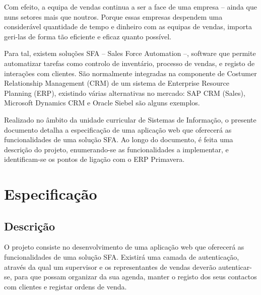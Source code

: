 \begin{titlepage}
Com efeito, a equipa de vendas continua a ser a face de uma empresa – ainda que nuns setores mais que noutros. Porque essas empresas despendem uma considerável quantidade de tempo e dinheiro com as equipas de vendas, importa geri-las de forma tão eficiente e eficaz quanto possível. 

Para tal, existem soluções SFA – Sales Force Automation –, software que permite automatizar tarefas como controlo de inventário, processo de vendas, e registo de interações com clientes. São normalmente integradas na componente de Costumer Relationship Management (CRM) de um sistema de Enterprise Resource Planning (ERP), existindo várias alternativas no mercado: SAP CRM (Sales), Microsoft Dynamics CRM e Oracle Siebel são alguns exemplos. 

Realizado no âmbito da unidade curricular de Sistemas de Informação, o presente documento detalha a especificação de uma aplicação web que oferecerá as funcionalidades de uma solução SFA. Ao longo do documento, é feita uma descrição do projeto, enumerando-se as funcionalidades a implementar, e identificam-se os pontos de ligação com o ERP Primavera. 


\newpage %


\section{Especificação}

\subsection{Descrição}
\justify\normalsize

O projeto consiste no desenvolvimento de uma aplicação web que oferecerá as funcionalidades de uma solução SFA. Existirá uma camada de autenticação, através da qual um supervisor e os representantes de vendas deverão autenticar-se, para que possam organizar da sua agenda, manter o registo dos seus contactos com clientes e registar ordens de venda.
 

\end{titlepage}
